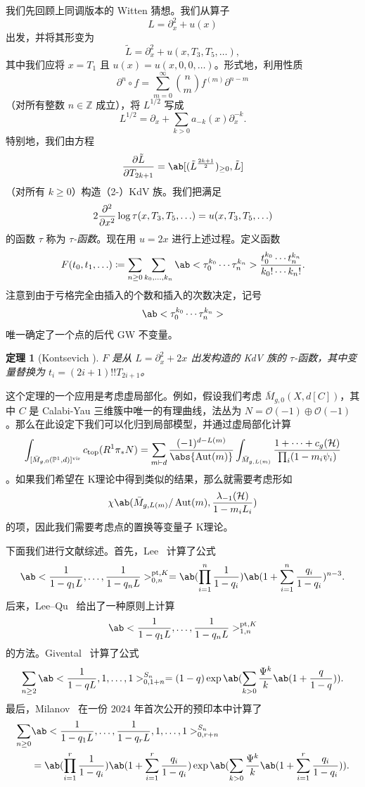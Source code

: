 \documentclass{amsart}
\newtheorem{thm}{定理}[section]
\theoremstyle{definition}
\theoremstyle{remark}
\theoremstyle{plain}
\theoremstyle{definition}
\theoremstyle{remark}
\newcommand{\Z}{\mathbb{Z}}
\renewcommand{\P}{\mathbb{P}}
\newcommand{\mc}[1]{\mathcal{#1}}
\newcommand{\mr}[1]{\mathrm{#1}}
\newcommand{\1}{\mathbf{1}}
\newcommand{\2}{\mathbf{2}}
\newcommand{\3}{\mathbf{3}}
\newcommand{\vir}{\mr{vir}}
\DeclareMathOperator{\Aut}{Aut}
\begin{document}
我们先回顾上同调版本的 Witten 猜想。我们从算子
\[ L = \partial_x^2 + u(x) \]
出发，并将其形变为
\[ \tilde{L} = \partial_x^2 + u(x, T_3, T_5, \ldots), \]
其中我们应将 \(x = T_1\) 且 \(u(x) = u(x, 0, 0,\ldots)\)。形式地，利用性质
\[ \partial^n \circ f = \sum_{m = 0}^{\infty} \binom{n}{m} f^{(m)} \partial^{n-m} \]
（对所有整数 \(n \in \Z\) 成立），将 \(L^{1/2}\) 写成
\[ L^{1/2} = \partial_x + \sum_{k > 0} a_{-k}(x) \partial_x^{-k}. \]
特别地，我们由方程
\[ \pdv{\tilde{L}}{T_{2k+1}} = \ab[(\tilde{L}^{\frac{2k+1}{2}})_{\geq 0}, \tilde{L}] \]
（对所有 \(k \geq 0\)）构造（2-）KdV 族。我们把满足
\[ 2 \pdv[2]{}{x}\log \tau(x, T_3, T_5, \ldots) = u(x, T_3, T_5, \ldots) \]
的函数 \(\tau\) 称为 \textit{\(\tau\)-函数}。现在用 \(u = 2x\) 进行上述过程。定义函数
\[ F(t_0, t_1, \ldots) \coloneqq \sum_{n \geq 0} \sum_{k_0, \ldots, k_n} \ab<\tau_0^{k_0} \cdots \tau_n^{k_n}> \frac{t_0^{k_0} \cdots t_n^{k_n}}{k_0! \cdots k_n!}. \]
注意到由于亏格完全由插入的个数和插入的次数决定，记号
\[ \ab<\tau_0^{k_0} \cdots \tau_n^{k_n}> \]
唯一确定了一个点的后代 GW 不变量。

\begin{thm}[Kontsevich {\cite{Kontsevich1992}}]
    \(F\) 是从 \(L = \partial_x^2 + 2x\) 出发构造的 KdV 族的 \(\tau\)-函数，其中变量替换为 \(t_i = (2i+1)!! T_{2i+1}\)。
\end{thm}

这个定理的一个应用是考虑虚局部化。例如，假设我们考虑 \(\bar{M}_{g,0}(X, d[C])\)，其中 \(C\) 是 Calabi-Yau 三维簇中唯一的有理曲线，法丛为 \(N = \mc{O}(-1)\oplus \mc{O}(-1)\)。那么在此设定下我们可以化归到局部模型，并通过虚局部化计算
\begin{align*}
    \int_{[\bar{M}_{g,0}(\P^1, d)]^{\vir}} c_{\mr{top}}(R^1 \pi_* N) = \sum_{m \vdash d} \frac{(-1)^{d-L(m)}}{\abs{\Aut(m)}} \int_{\bar{M}_{g, L(m)}} \frac{1 + \cdots + c_g(\mc{H})}{\prod_i (1-m_i \psi_i)}
\end{align*}
。如果我们希望在 K理论中得到类似的结果，那么就需要考虑形如
\[ \chi\ab(\bar{M}_{g, L(m)}/\Aut(m), \frac{\lambda_{-1}(\mc{H})}{1-m_i L_i}) \]
的项，因此我们需要考虑点的置换等变量子 K理论。

下面我们进行文献综述。首先，Lee~\cite{Lee1997} 计算了公式
\[ \ab<\frac{1}{1-q_1 L}, \ldots, \frac{1}{1-q_n L}>_{0,n}^{\mr{pt}, K} = \ab(\prod_{i=1}^n \frac{1}{1-q_i}) \ab(1 + \sum_{i=1}^n \frac{q_i}{1-q_i})^{n-3}. \]
后来，Lee--Qu~\cite{LeeQu2014} 给出了一种原则上计算
\[ \ab<\frac{1}{1-q_1 L}, \ldots, \frac{1}{1-q_n L}>_{1,n}^{\mr{pt}, K} \]
的方法。Givental~\cite{Givental2017K1} 计算了公式
\[ \sum_{n \geq 2} \ab<\frac{1}{1-q L}, 1, \ldots, 1>_{0,1+n}^{S_n} = (1-q) \exp\ab(\sum_{k > 0} \frac{\Psi^k}{k} \ab(1 + \frac{q}{1-q})). \]
最后，Milanov~\cite{Milanov2025} 在一份 2024 年首次公开的预印本中计算了
\begin{align*}
    \sum_{n \geq 0}& \ab<\frac{1}{1-q_1 L}, \ldots, \frac{1}{1-q_r L}, 1, \ldots, 1>_{0,r+n}^{S_n} \\
    &= \ab(\prod_{i=1}^{r} \frac{1}{1-q_i})\ab(1 + \sum_{i=1}^r \frac{q_i}{1-q_i}) \exp\ab(\sum_{k > 0} \frac{\Psi^k}{k} \ab(1 + \sum_{i=1}^r \frac{q_i}{1-q_i})). 
\end{align*}
\end{document}
